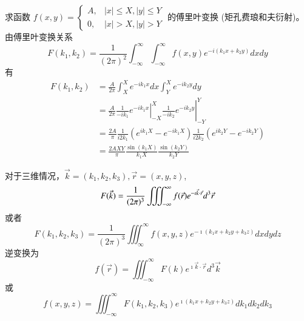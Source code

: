 \begin{examplebox}{
    求函数 $f(x, y)= \begin{cases}A, & |x| \leq X,|y| \leq Y \\ 0, & |x|>X,|y|>Y\end{cases}$ 的傅里叶变换 (矩孔费琅和夫衍射)。
}
由傅里叶变换关系
$$
F\left(k_1, k_2\right)=\frac{1}{(2 \pi)^2} \int_{-\infty}^{\infty} \int_{-\infty}^{\infty} f(x, y) e^{-i\left(k_1 x+k_2 y\right)} d x d y
$$
有
$$
\begin{aligned}
F\left(k_1, k_2\right) & =\frac{A}{2 \pi} \int_X^X e^{-i k_1 x} d x \int_Y^X e^{-i k_2 y} d y \\
& =\left.\left.\frac{A}{2 \pi} \frac{1}{-i k_1} e^{-i k_1 x}\right|_{-X} ^X \frac{1}{-i k_2} e^{-i k_2 y}\right|_{-Y} ^Y \\
& =\frac{2A}{\pi} \frac{1}{i 2 k_1}\left(e^{i k_1 X}-e^{-i k_1 X}\right) \frac{1}{i 2 k_2}\left(e^{i k_2 Y}-e^{-i k_2 Y}\right) \\
& =\frac{2A X Y}{\pi} \frac{\sin \left(k_1 X\right)}{k_1 X} \frac{\sin \left(k_2 Y\right)}{k_2 Y}
\end{aligned}
$$
\end{examplebox}

对于三维情况，$\vec{k}=\left(k_1, k_2, k_3\right), \vec{r}=(x, y, z)$,
\begin{equation}
    F(\vec{k})=\frac{1}{(2 \pi)^3} \iiint_{-\infty}^{\infty} f(\vec{r}) e^{-\imath  \vec{k} \cdot \vec{r}} d^3 \vec{r} \\
\end{equation}
或者
\begin{equation}
    F\left(k_1, k_2, k_3\right)=\frac{1}{(2 \pi)^3} \iiint_{\infty}^{\infty} f(x, y, z) e^{-\imath\left(k_1 x+k_2 y+k_3 z\right)} d x d y d z 
\end{equation}
逆变换为
\begin{equation}
     f(\vec{r})=\iiint_{-\infty}^{\infty} F(k) e^{\imath \vec{k} \cdot \vec{r}} d^3 \vec{k} 
\end{equation}  
或
\begin{equation}
f(x, y, z)=\iiint_{-\infty}^{\infty} F\left(k_1, k_2, k_3\right) e^{\imath\left(k_1 x+k_2 y+k_3 z\right)} d k_1 d k_2 d k_3 
\end{equation} 
